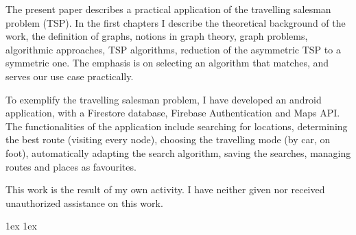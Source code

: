 \documentclass[final]{ubb_dolgozat}
\author{%
Lorenzovici Zsombor
}
\begin{document}
\begin{abstractEN} %


The present paper describes a practical application of the travelling salesman problem (TSP). In the first chapters I describe the theoretical background of the work, the definition of graphs, notions in graph theory, graph problems, algorithmic approaches, TSP algorithms, reduction of the asymmetric TSP to a symmetric one. The emphasis is on selecting an algorithm that matches, and serves our use case practically.

To exemplify the travelling salesman problem, I have developed an android application, with a Firestore database, Firebase Authentication and Maps API. The functionalities of the application include searching for locations, determining the best route (visiting every node), choosing the travelling mode (by car, on foot), automatically adapting the search algorithm, saving the searches, managing routes and places as favourites.

This work is the result of my own activity. I have neither given nor received unauthorized assistance on this work.

\end{abstractEN}

\maketitle


{ \baselineskip 1ex
  \parskip 1ex
  \tableofcontents
}









%



%










{ \renewcommand{\baselinestretch}{0.8}\normalsize %
	\setlength{\itemsep}{-2.4mm}
	\setlength{\bibspacing}{0.67\baselineskip}
	
	
}
\end{document}
